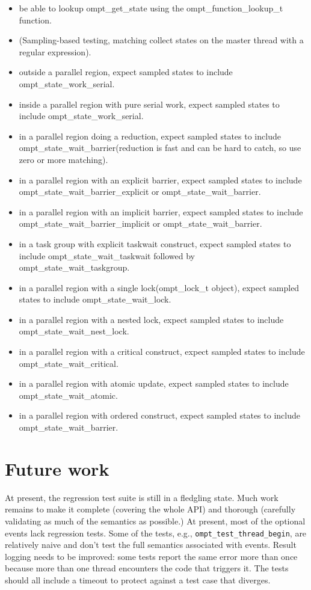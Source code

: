 \documentclass{article}
\begin{document}
    \begin{itemize}
        \item  be able to lookup ompt\_get\_state using the ompt\_function\_lookup\_t function.
        \item (Sampling-based testing, matching collect states on the master thread with a regular expression).
        \item outside a parallel region,  expect sampled states to include  ompt\_state\_work\_serial.
        \item inside a parallel region with pure serial work,  expect sampled states to include ompt\_state\_work\_serial.
        \item in a parallel region doing a reduction, expect sampled states to include ompt\_state\_wait\_barrier(reduction is fast and can be hard to catch, so use zero or more matching).
        \item in a parallel region with an explicit barrier, expect sampled states to include  ompt\_state\_wait\_barrier\_explicit or ompt\_state\_wait\_barrier.
        \item in a parallel region with an implicit barrier, expect sampled states to include ompt\_state\_wait\_barrier\_implicit or ompt\_state\_wait\_barrier.
        \item in a task group with explicit taskwait construct, expect sampled states to include ompt\_state\_wait\_taskwait followed by ompt\_state\_wait\_taskgroup.
        \item in a parallel region with a single lock(ompt\_lock\_t object), expect sampled states to include ompt\_state\_wait\_lock.
        \item in a parallel region with a nested lock, expect sampled states to include ompt\_state\_wait\_nest\_lock.
        \item in a parallel region with a critical construct, expect sampled states to include ompt\_state\_wait\_critical.
        \item in a parallel region with atomic update, expect sampled states to include ompt\_state\_wait\_atomic.
        \item in a parallel region with ordered construct, expect sampled states to include ompt\_state\_wait\_barrier.
    \end{itemize}



\section{Future work}
At present, the regression test suite is still in a fledgling state. Much work remains to make it complete (covering the whole API) and thorough (carefully validating as much of the semantics as possible.) At present, most of the optional events lack regression tests. Some of the tests, e.g., \verb|ompt_test_thread_begin|, are relatively naive and don't test the full semantics associated with events. Result logging needs to be improved: some tests  report the same error more than once because more than one thread encounters the code that triggers it. The tests should all include a timeout to protect against a test case that diverges.
\end{document}
